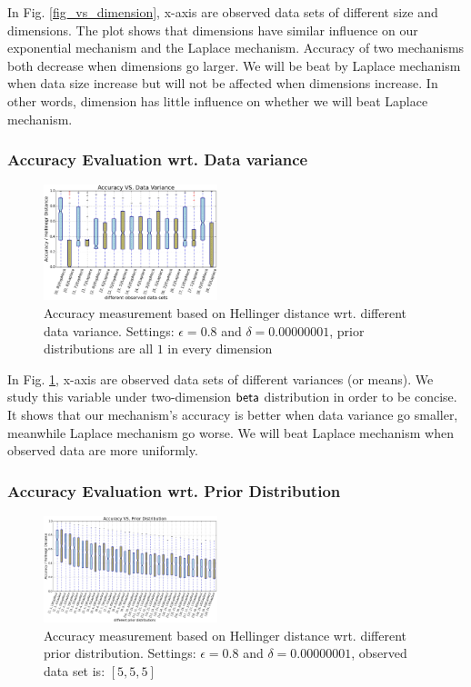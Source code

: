 \documentclass[sigconf, anonymous]{acmart}
\begin{document}
In Fig. \ref{fig_vs_dimension}, x-axis are observed data sets of different size and dimensions. The plot shows that dimensions have similar influence on our exponential mechanism and the Laplace mechanism. Accuracy of two mechanisms both decrease when dimensions go larger. We will be beat by Laplace mechanism when data size increase but will not be affected when dimensions increase. In other words, dimension has little influence on whether we will beat Laplace mechanism.


\subsubsection{Accuracy Evaluation wrt. Data variance}
\label{subsubsec_vs_variance}

\begin{figure}[ht]
\centering
\includegraphics[width=0.45\textwidth]{accuracy_vs_mean_1_1.eps}
\caption{Accuracy measurement based on Hellinger distance wrt. different data variance. Settings: $\epsilon = 0.8$ and $\delta = 0.00000001$, prior distributions are all $1$ in every dimension}
\label{fig_vs_variance}
\end{figure}

In Fig. \ref{fig_vs_variance}, x-axis are observed data sets of different variances (or means). We study this variable under two-dimension $\mathsf{beta}$ distribution in order to be concise. It shows that our mechanism's accuracy is better when data variance go smaller, meanwhile Laplace mechanism go worse. We will beat Laplace mechanism when observed data are more uniformly.



\subsubsection{Accuracy Evaluation wrt. Prior Distribution}
\label{subsubsec_vs_prior}

\begin{figure}[ht]
\centering
\includegraphics[width=0.45\textwidth]{accuracy_vs_prior_5_5_5.eps}
\caption{Accuracy measurement based on Hellinger distance wrt. different prior distribution. Settings: $\epsilon = 0.8$ and $\delta = 0.00000001$, observed data set is: $[5,5,5]$}
\label{fig_vs_prior}
\end{figure}
\end{document}
